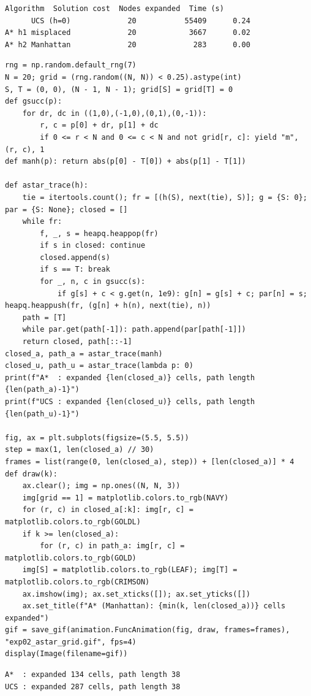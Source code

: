 \documentclass[11pt]{article}
\begin{document}
\begin{lstlisting}[style=out]
Algorithm  Solution cost  Nodes expanded  Time (s)
      UCS (h=0)             20           55409      0.24
A* h1 misplaced             20            3667      0.02
A* h2 Manhattan             20             283      0.00
\end{lstlisting}
\begin{lstlisting}[style=py]
rng = np.random.default_rng(7)
N = 20; grid = (rng.random((N, N)) < 0.25).astype(int)
S, T = (0, 0), (N - 1, N - 1); grid[S] = grid[T] = 0
def gsucc(p):
    for dr, dc in ((1,0),(-1,0),(0,1),(0,-1)):
        r, c = p[0] + dr, p[1] + dc
        if 0 <= r < N and 0 <= c < N and not grid[r, c]: yield "m", (r, c), 1
def manh(p): return abs(p[0] - T[0]) + abs(p[1] - T[1])

def astar_trace(h):
    tie = itertools.count(); fr = [(h(S), next(tie), S)]; g = {S: 0}; par = {S: None}; closed = []
    while fr:
        f, _, s = heapq.heappop(fr)
        if s in closed: continue
        closed.append(s)
        if s == T: break
        for _, n, c in gsucc(s):
            if g[s] + c < g.get(n, 1e9): g[n] = g[s] + c; par[n] = s; heapq.heappush(fr, (g[n] + h(n), next(tie), n))
    path = [T]
    while par.get(path[-1]): path.append(par[path[-1]])
    return closed, path[::-1]
closed_a, path_a = astar_trace(manh)
closed_u, path_u = astar_trace(lambda p: 0)
print(f"A*  : expanded {len(closed_a)} cells, path length {len(path_a)-1}")
print(f"UCS : expanded {len(closed_u)} cells, path length {len(path_u)-1}")

fig, ax = plt.subplots(figsize=(5.5, 5.5))
step = max(1, len(closed_a) // 30)
frames = list(range(0, len(closed_a), step)) + [len(closed_a)] * 4
def draw(k):
    ax.clear(); img = np.ones((N, N, 3))
    img[grid == 1] = matplotlib.colors.to_rgb(NAVY)
    for (r, c) in closed_a[:k]: img[r, c] = matplotlib.colors.to_rgb(GOLDL)
    if k >= len(closed_a):
        for (r, c) in path_a: img[r, c] = matplotlib.colors.to_rgb(GOLD)
    img[S] = matplotlib.colors.to_rgb(LEAF); img[T] = matplotlib.colors.to_rgb(CRIMSON)
    ax.imshow(img); ax.set_xticks([]); ax.set_yticks([])
    ax.set_title(f"A* (Manhattan): {min(k, len(closed_a))} cells expanded")
gif = save_gif(animation.FuncAnimation(fig, draw, frames=frames), "exp02_astar_grid.gif", fps=4)
display(Image(filename=gif))
\end{lstlisting}
\begin{lstlisting}[style=out]
A*  : expanded 134 cells, path length 38
UCS : expanded 287 cells, path length 38
\end{lstlisting}
\end{document}
